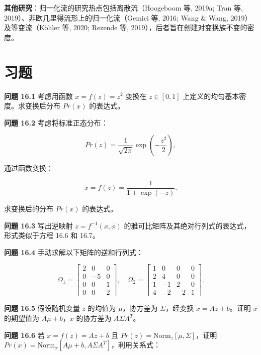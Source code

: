 \textbf{其他研究}：归一化流的研究热点包括离散流（Hoogeboom 等, 2019a; Tran 等, 2019）、非欧几里得流形上的归一化流（Gemici 等, 2016; Wang \& Wang, 2019）及等变流（Köhler 等, 2020; Rezende 等, 2019），后者旨在创建对变换族不变的密度。

\section{习题}
\textbf{问题 16.1} 考虑用函数 \(x = f(z) = z^2\) 变换在 \(z \in [0, 1]\) 上定义的均匀基本密度。求变换后分布 \(Pr(x)\) 的表达式。

\textbf{问题 16.2} 考虑将标准正态分布：

\begin{equation}
Pr(z) = \frac{1}{\sqrt{2\pi}} \exp\left(-\frac{z^2}{2}\right), 
\end{equation}

通过函数变换：

\begin{equation}
x = f(z) = \frac{1}{1 + \exp(-z)}. 
\end{equation}

求变换后的分布 \(Pr(x)\) 的表达式。

\textbf{问题 16.3} 写出逆映射 \(z = f^{-1}(x, \phi)\) 的雅可比矩阵及其绝对行列式的表达式，形式类似于方程 16.6 和 16.7。

\textbf{问题 16.4} 手动求解以下矩阵的逆和行列式：

\begin{equation}
\Omega_1 = \begin{bmatrix}
2 & 0 & 0 \\
0 & -5 & 0 \\
0 & 0 & 1 \\
0 & 0 & 2
\end{bmatrix}, \quad
\Omega_2 = \begin{bmatrix}
1 & 0 & 0 & 0\\
2 & 4 & 0 & 0\\
1 & -1 & 2 & 0\\
4 & -2 & -2 & 1
\end{bmatrix}. 
\end{equation}

\textbf{问题 16.5} 假设随机变量 \(z\) 的均值为 \(\mu\)，协方差为 \(\Sigma\)，经变换 \(x = Az + b\)。证明 \(x\) 的期望值为 \(A\mu + b\)，\(x\) 的协方差为 \(A\Sigma A^T\)。

\textbf{问题 16.6} 若 \(x = f(z) = Az + b\) 且 \(Pr(z) = \text{Norm}_z[\mu, \Sigma]\)，证明 \(Pr(x) = \text{Norm}_x[A\mu + b, A\Sigma A^T]\)，利用关系式：

